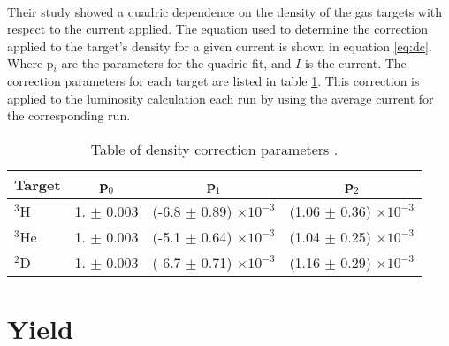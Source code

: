  \paragraph{}Their study showed a quadric dependence on the density of the gas targets with respect to the current applied. The equation used to determine the correction applied to the target's density for a given current is shown in equation \ref{eq:dc}. Where p$_i$ are the parameters for the quadric fit, and $I$ is the current. The correction parameters for each target are listed in table \ref{denct}.  This correction is applied to the luminosity calculation each run by using the average current for the corresponding run. 

\begin{table}[]
	\caption{Table of density correction parameters \cite{denscor}.}
	\label{denct}
	\centering
	\begin{tabular}{lccc}
			\hline
		Target & p$_0$ & p$_1$ & p$_2$  \\
		\hline
		$^3$H & 1. $\pm$ 0.003 & (-6.8 $\pm$ 0.89) $\times 10^{-3}$ & (1.06 $\pm$ 0.36) $\times 10^{-3}$\\
		$^3$He & 1. $\pm$ 0.003 & (-5.1 $\pm$ 0.64) $\times 10^{-3}$ & (1.04 $\pm$ 0.25) $\times 10^{-3}$\\
		$^2$D & 1. $\pm$ 0.003 & (-6.7 $\pm$ 0.71) $\times 10^{-3}$ & (1.16 $\pm$ 0.29) $\times 10^{-3}$\\
		\hline
	\end{tabular}
\end{table}

\section{Yield}\label{sec:Yield}
